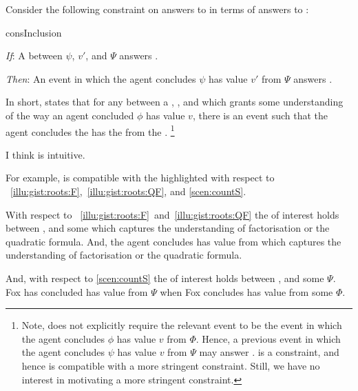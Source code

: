 \begin{note}
  Consider the following constraint on answers to \qWhy{} in terms of answers to \qHow{}:

  \begin{constraint}{consInclusion}{\issueInclusion{}}
    \mbox{ }
    \vspace{-\baselineskip}
    \begin{itenum}
    \item[\emph{If}:]
      A \ros{} between \(\psi\), \(v'\), and \(\Psi\) answers \qWhy{}.
    \item[\emph{Then}:]
      An event in which the agent concludes \(\psi\) has value \(v'\) from \(\Psi\) answers \qHow{}.
    \end{itenum}
    \vspace{-\baselineskip}
  \end{constraint}

  \noindent%
  In short, \issueInclusion{} states that for any \ros{} between a , , and \pool{} which grants some understanding of the way an agent concluded \(\phi\) has value \(v\), there is an event such that the agent concludes the \prop{} has the \val{} from the \pool{}.%
  \footnote{
    Note, \qHow{} does not explicitly require the relevant event to be the event in which the agent concludes \(\phi\) has value \(v\) from \(\Phi\).
    Hence, a previous event in which the agent concludes \(\psi\) has value \(v\) from \(\Psi\) may answer \qHow{}.
    \issueInclusion{} is a constraint, and hence is compatible with a more stringent constraint.
    Still, we have no interest in motivating a more stringent constraint.
  }

  I think \issueInclusion{} is intuitive.

  For example, \issueInclusion{} is compatible with the  highlighted with respect to ~\ref{illu:gist:roots:F},~\ref{illu:gist:roots:QF}, and \autoref{scen:countS}.

  With respect to ~\ref{illu:gist:roots:F}~and~\ref{illu:gist:roots:QF} the \ros{} of interest holds between \propM{\rootsCon{}},  and some \pool{} which captures the \agents{} understanding of factorisation or the quadratic formula.
  And, the agent concludes \propM{\rootsCon{}} has value  from \pool{} which captures the \agents{} understanding of factorisation or the quadratic formula.

  And, with respect to \autoref{scen:countS} the \ros{} of interest holds between ,  and some \pool{} \(\Psi\).
  Fox has concluded  has value  from \(\Psi\) when Fox concludes  has value  from some \pool{} \(\Phi\).
\end{note}


